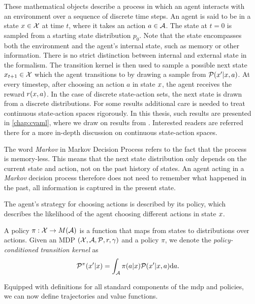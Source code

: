 These mathematical objects describe a process in which an agent interacts with an environment over a sequence of discrete time steps.
An agent is said to be in a state $x \in \mathcal{X}$ at time $t$, where it takes an action $a \in \mathcal{A}$.
The state at $t=0$ is sampled from a starting state distribution $p_0$.
Note that the state encompasses both the environment and the agent's internal state, such as memory or other information.
There is no strict distinction between internal and external state in the formalism.
The transition kernel is then used to sample a possible next state $x_{t+1} \in \mathcal{X}$ which the agent transitions to by drawing a sample from $\mathcal{P}(x'|x,a)$.
At every timestep, after choosing an action $a$ in state $x$, the agent receives the reward $r(x,a)$.
In the case of discrete state-action sets, the next state is drawn from a discrete distributions.
For some results additional care is needed to treat continuous state-action spaces rigorously.
In this thesis, such results are presented in \autoref{chap:cvaml}, where we draw on results from \textcite{bertsekasshreve1978}.
Interested readers are referred there for a more in-depth discussion on continuous state-action spaces.

The word \emph{Markov} in Markov Decision Process refers to the fact that the process is memory-less.
This means that the next state distribution only depends on the current state and action, not on the past history of states.
An agent acting in a \emph{Markov} decision process therefore does not need to remember what happened in the past, all information is captured in the present state.

The agent's strategy for choosing actions is described by its policy, which describes the likelihood of the agent choosing different actions in state $x$.

\begin{definition}[Policy]
    A policy $\pi: \mathcal{X} \rightarrow M(\mathcal{A})$ is a function that maps from states to distributions over actions.
    Given an MDP $(\mathcal{X},\mathcal{A},\mathcal{P},r,\gamma)$ and a policy $\pi$, we denote the \emph{policy-conditioned transition kernel} as $$\mathcal{P}^\pi(x'|x) = \int_{\mathcal{A}} \pi(a|x) \mathcal{P}(x'|x, a) \mathrm{d} a.$$
\end{definition}

Equipped with definitions for all standard components of the \ac{mdp} and policies, we can now define trajectories and value functions.

